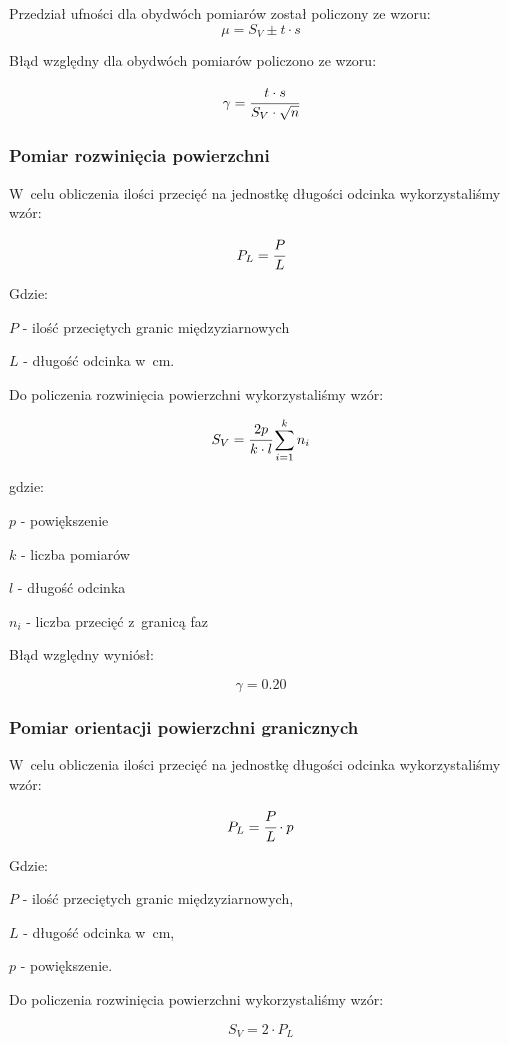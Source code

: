\documentclass[a4paper,12pt]{article}
\begin{document}
Przedział ufności dla obydwóch pomiarów został policzony ze wzoru:
$$\mu = S_V\pm t\cdot s$$
\newline 

Błąd względny dla obydwóch pomiarów policzono ze wzoru:

$$\gamma=\cfrac{t\cdot s}{S_V\cdot \sqrt{n}}$$


\subsubsection{Pomiar rozwinięcia powierzchni}

W~celu obliczenia ilości przecięć na jednostkę długości odcinka wykorzystaliśmy wzór:

$$P_L=\cfrac{P}{L}$$

Gdzie:

$P$ - ilość przeciętych granic międzyziarnowych

$L$ - długość odcinka w~cm.
\newpage

Do policzenia rozwinięcia powierzchni wykorzystaliśmy wzór:

$$S_V=\cfrac{2p}{k\cdot l} \sum ^k_{i=1}n_i$$

gdzie:

$p$ - powiększenie

$k$ - liczba pomiarów

$l$ - długość odcinka

$n_i$ - liczba przecięć z~granicą faz



Błąd względny wyniósł:

$$\gamma=0.20$$
\newpage

\subsubsection{Pomiar orientacji powierzchni granicznych}

W~celu obliczenia ilości przecięć na jednostkę długości odcinka wykorzystaliśmy wzór:

$$P_L=\cfrac{P}{L} \cdot p$$

Gdzie:

$P$ - ilość przeciętych granic międzyziarnowych,

$L$ - długość odcinka w~cm,

$p$ - powiększenie.
\newline

Do policzenia rozwinięcia powierzchni wykorzystaliśmy wzór:

$$S_V= 2\cdot P_L$$
\end{document}

